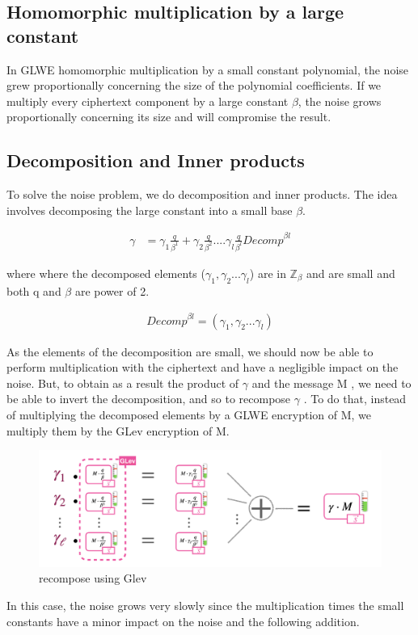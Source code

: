 \documentclass{techrep}
\theoremstyle{definition}
\theoremstyle{plain}
\newcommand{\Z}{\mathbb{Z}}
\begin{document}
\subsection{Homomorphic multiplication by a large constant}
In GLWE homomorphic multiplication by a small constant polynomial, the noise grew proportionally concerning the size of the polynomial coefficients.
If we multiply every ciphertext component by a large constant $\beta$, the noise grows proportionally concerning its size and will compromise the result. 

\subsection{Decomposition and Inner products}
To solve the noise problem, we do decomposition and inner products. The idea involves decomposing the large constant into a small base $\beta$.

\begin{align*}
 \gamma &= \gamma_1\frac{q}{\beta^1} + \gamma_2\frac{q}{\beta^2} .... \gamma_l\frac{q}{\beta^l} 
 {Decomp}^{\beta l} 
\end{align*}

where where the decomposed elements ($\gamma_1, \gamma_2 ... \gamma_l$) are in $\Z_\beta$ and are small and both q and $\beta$ are power of 2.

\begin{align*}
 {Decomp}^{\beta l} = (\gamma_1, \gamma_2 ... \gamma_l)
\end{align*}

As the elements of the decomposition are small, we should now be able to perform multiplication with the ciphertext and have a negligible impact on the noise. But, to obtain as a result the product of $\gamma$ and the message M
 , we need to be able to invert the decomposition, and so to recompose $\gamma$
. To do that, instead of multiplying the decomposed elements by a GLWE encryption of M, we multiply them by the GLev encryption of M.

	\begin{figure}[H]
		\centering
	\includegraphics[width=.9\columnwidth]{fig/Glev_decomp.png}
		\caption{recompose using Glev}
		\label{fig:GLev_decomp}
	\end{figure}
 In this case, the noise grows very slowly since the multiplication times the small constants have a minor impact on the noise and the following addition.
\end{document}

